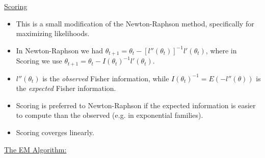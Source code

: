 \documentclass[a4paper, 10pt]{article}
\begin{document}
\vspace{0.3in}

\underline{Scoring}

\begin{itemize}
	\item This is a small modification of the Newton-Raphson method, specifically for maximizing likelihoods. 
	\item In Newton-Raphson we had $\theta_{t+1} = \theta_t - \left [l''(\theta_t) \right ] ^{-1} l'(\theta_t)$, where in Scoring we use $\theta_{t+1} = \theta_t - I(\theta_t)^{-1} l'(\theta_t)$.
	\item $l''(\theta_t)$ is the \emph{observed} Fisher information, while $I(\theta_t)^{-1} = E(-l''(\theta))$ is the \emph{expected} Fisher information.
	\item Scoring is preferred to Newton-Raphson if the expected information is easier to compute than the observed (e.g. in exponential families).
	\item Scoring coverges linearly. 
\end{itemize}

\vspace{0.3in}

\underline{The EM Algorithm:}
\end{document}
